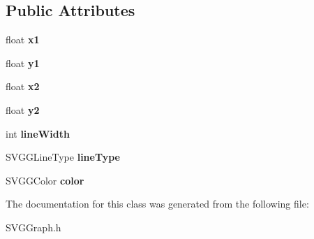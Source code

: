 \subsection*{Public Attributes}
\begin{DoxyCompactItemize}
\item 
\hypertarget{classSVGGLine_a74618f36cfd1a034932ed9460c823da2}{
float {\bfseries x1}}
\label{classSVGGLine_a74618f36cfd1a034932ed9460c823da2}

\item 
\hypertarget{classSVGGLine_a6b35e91038522cc76e3fc5659970ff1b}{
float {\bfseries y1}}
\label{classSVGGLine_a6b35e91038522cc76e3fc5659970ff1b}

\item 
\hypertarget{classSVGGLine_a0c16b37f656ff28a9c3e0e580d178b1a}{
float {\bfseries x2}}
\label{classSVGGLine_a0c16b37f656ff28a9c3e0e580d178b1a}

\item 
\hypertarget{classSVGGLine_aa36e24b6e689f4d8e8da2b82203de3c5}{
float {\bfseries y2}}
\label{classSVGGLine_aa36e24b6e689f4d8e8da2b82203de3c5}

\item 
\hypertarget{classSVGGLine_a35cdde66a9a3cd341b9b48675f4e746d}{
int {\bfseries lineWidth}}
\label{classSVGGLine_a35cdde66a9a3cd341b9b48675f4e746d}

\item 
\hypertarget{classSVGGLine_adf4a0c03ed8a73cf03493625974fb15f}{
SVGGLineType {\bfseries lineType}}
\label{classSVGGLine_adf4a0c03ed8a73cf03493625974fb15f}

\item 
\hypertarget{classSVGGLine_ac486898bab4a78743c3393c4dd7d94da}{
SVGGColor {\bfseries color}}
\label{classSVGGLine_ac486898bab4a78743c3393c4dd7d94da}

\end{DoxyCompactItemize}


The documentation for this class was generated from the following file:\begin{DoxyCompactItemize}
\item 
SVGGraph.h\end{DoxyCompactItemize}
